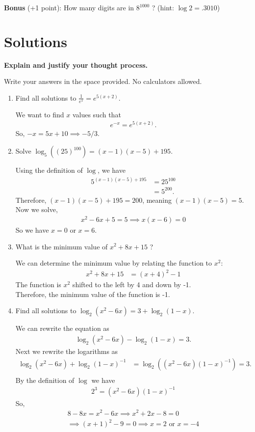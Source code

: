 \documentclass[a4paper, 12pt]{article}
\newcommand{\bt}[1]{\textbf{#1}} %
\newcommand{\eq}[1]{\begin{align*}#1\end{align*}} %
\renewcommand{\eq}[1]{\begin{align*}#1\end{align*}} %
\newcommand{\green}[1]{\textcolor{javagreen}{#1}} %
\begin{document}
\bt{Bonus} (+1 point): How many digits are in $8^{1000}$ ? (hint: $\log 2 = .3010$) 

\newpage

\section*{Solutions}

\bt{Explain and justify your thought process.}

Write your answers in the space provided. No calculators allowed.

\begin{enumerate}
    \item Find all solutions to $\frac{1}{e^x} = e^{5(x+2)}$.

    \green{
    We want to find $x$ values such that 
    \eq{
    e^{-x} = e^{5(x+2)}.
    }
    So, $-x = 5x + 10 \implies -5/3$.
    }
    \item Solve $\log_5 ((25)^{100}) = (x-1)(x-5) + 195$.

    \green{
    Using the definition of $\log$, we have
    \eq{
    5^{(x-1)(x-5)+195} &= 25^{100} \\
    & = 5^{200}.
    }
    Therefore, $(x-1)(x-5) + 195 = 200$, meaning $(x-1)(x-5) = 5$. \\
    Now we solve, 
    \eq{
    x^2 -6x + 5 = 5 \implies x(x-6) = 0 
    }
    So we have $x = 0$ or $x = 6$.
    }
    \item What is the minimum value of $x^2 + 8x + 15$ ?

    \green{
    We can determine the minimum value by relating the function to $x^2$: 
    \eq{
    x^2 + 8x + 15 &= (x+4)^2 -1 
    }
    The function is $x^2$ shifted to the left by 4 and down by -1.  \\
    Therefore, the minimum value of the function is -1.
    }
    \item Find all solutions to $\log_2 (x^2 - 6x) = 3 + \log_2 (1-x)$.

    \green{
    We can rewrite the equation as 
    \eq{
    \log_2(x^2 - 6x) - \log_2(1-x) = 3.
    }
    Next we rewrite the logarithms as 
    \eq{
    \log_2(x^2 -6x) + \log_2(1-x)^{-1} &= 
    \log_2((x^2 - 6x)(1-x)^{-1}) = 3.\\
    }
    By the definition of $\log$ we have
    \eq{
    2^3 = (x^2 - 6x)(1-x)^{-1}
    }
    So, 
    \eq{
    8 - 8x = x^2 -6x \implies x^2 +2x - 8 = 0\\
    \implies (x+1)^2 -9 = 0 \implies x = 2 \text{ or } x = -4
    }
    }
\end{enumerate}
\end{document}
